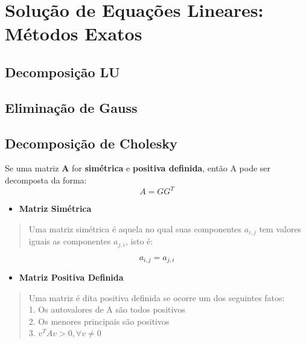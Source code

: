 \documentclass[
]{book}
\providecommand{\tightlist}{%
  \setlength{\itemsep}{0pt}\setlength{\parskip}{0pt}}
\begin{document}
\hypertarget{soluuxe7uxe3o-de-equauxe7uxf5es-lineares-muxe9todos-exatos}{%
\section{Solução de Equações Lineares: Métodos Exatos}\label{soluuxe7uxe3o-de-equauxe7uxf5es-lineares-muxe9todos-exatos}}

\hypertarget{decomposiuxe7uxe3o-lu}{%
\subsection{Decomposição LU}\label{decomposiuxe7uxe3o-lu}}

\hypertarget{eliminauxe7uxe3o-de-gauss}{%
\subsection{Eliminação de Gauss}\label{eliminauxe7uxe3o-de-gauss}}

\hypertarget{decomposiuxe7uxe3o-de-cholesky}{%
\subsection{Decomposição de Cholesky}\label{decomposiuxe7uxe3o-de-cholesky}}

Se uma matriz \textbf{A} for \textbf{simétrica} e \textbf{positiva definida}, então A pode ser decomposta da forma:
\[A = GG^T\]

\begin{itemize}
\tightlist
\item
  \textbf{Matriz Simétrica}
\end{itemize}

\begin{quote}
Uma matriz simétrica é aquela no qual suas componentes \(a_{i,j}\) tem valores iguais as componentes \(a_{j,i}\), isto é:
\end{quote}

\[a_{i,j} = a_{j,i}\]

\begin{itemize}
\tightlist
\item
  \textbf{Matriz Positiva Definida}
\end{itemize}

\begin{quote}
Uma matriz é dita positiva definida se ocorre um dos seguintes fatos:\\
1. Os autovalores de A são todos positivos\\
2. Os menores principais são positivos\\
3. \(v^TAv > 0, \forall v \neq 0\)
\end{quote}
\end{document}

